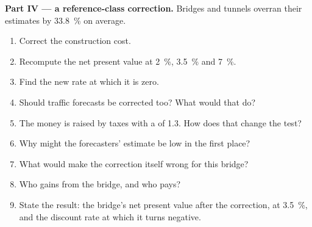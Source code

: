 \begin{problem}
\begin{center}
\end{center}

\medskip\noindent\textbf{Part IV --- a reference-class correction.} Bridges and tunnels
overran their estimates by 33.8~\% on average.
\begin{enumerate}[resume]
\item Correct the construction cost.
\item Recompute the net present value at 2~\%, 3.5~\% and 7~\%.
\item Find the new rate at which it is zero.
\item Should traffic forecasts be corrected too? What would that do?
\item The money is raised by taxes with a  of 1.3. How
does that change the test?
\item Why might the forecasters' estimate be low in the first place?
\item What would make the correction itself wrong for this bridge?
\item Who gains from the bridge, and who pays?
\item State the result: the bridge's net present value after the correction, at
3.5~\%, and the discount rate at which it turns negative.
\end{enumerate}
\end{problem}

